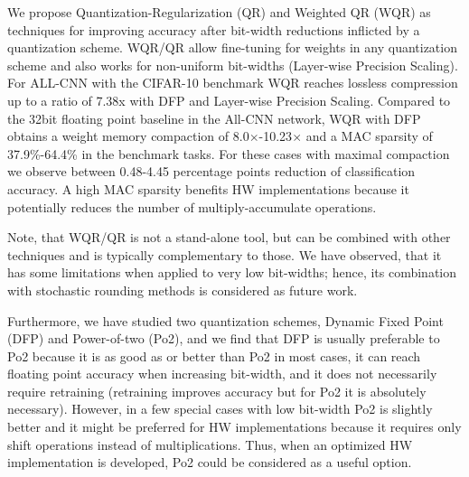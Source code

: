 We propose Quantization-Regularization (QR) and Weighted QR (WQR) as techniques for improving accuracy after bit-width reductions inflicted by a quantization scheme. WQR/QR allow fine-tuning for weights in any quantization scheme and also works for non-uniform bit-widths (Layer-wise Precision Scaling). For ALL-CNN with the CIFAR-10 benchmark WQR reaches lossless compression up to a ratio of 7.38x with DFP and Layer-wise Precision Scaling.
Compared to the 32bit floating point baseline in the All-CNN network, WQR with DFP obtains a weight memory compaction of 8.0$\times$-10.23$\times$ and a MAC sparsity of 37.9\%-64.4\% in the benchmark tasks. For these cases with maximal compaction we observe between 0.48-4.45 percentage points reduction of classification accuracy. A high MAC sparsity benefits HW implementations because it potentially reduces the number of multiply-accumulate operations.

Note, that WQR/QR is not a stand-alone tool, but can be combined with other techniques and is typically complementary to those.
We have observed, that it has some limitations when applied to very low bit-widths; hence, its combination with stochastic rounding methods is considered as future work.

Furthermore, we have studied two quantization schemes, Dynamic Fixed Point (DFP) and Power-of-two (Po2), and we find that DFP is usually preferable to Po2 because it is as good as or better than Po2 in most cases, it can reach floating point accuracy when increasing bit-width, and it does not necessarily require retraining (retraining improves accuracy but for Po2 it is absolutely necessary). However, in a few special cases with low bit-width Po2 is slightly better and it might be preferred for HW implementations because it requires only shift operations instead of multiplications. Thus, when an optimized HW implementation is developed, Po2 could be considered as a useful option.



